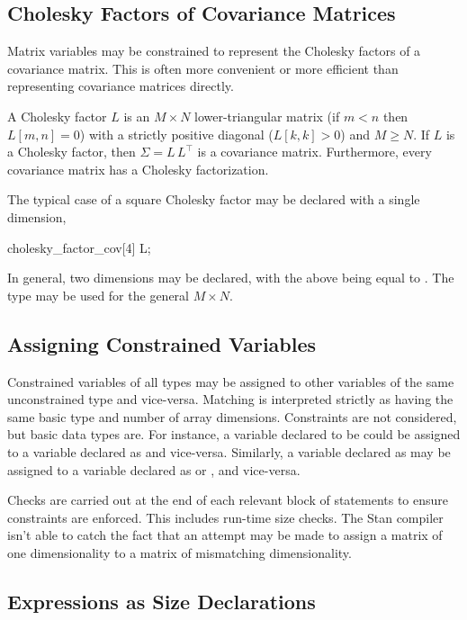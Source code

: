 \subsection{Cholesky Factors of Covariance Matrices}

Matrix variables may be constrained to represent the Cholesky factors
of a covariance matrix.  This is often more convenient or more
efficient than representing covariance matrices directly.

A Cholesky factor $L$ is an $M \times N$ lower-triangular matrix (if
$m < n$ then $L[m, n] =0$) with a strictly positive diagonal ($L[k, k]
> 0$) and $M \geq N$.  If $L$ is a Cholesky factor, then $\Sigma = L
\, L^{\top}$ is a covariance matrix.  Furthermore, every covariance
matrix has a Cholesky factorization.

The typical case of a square Cholesky factor may be declared with a
single dimension,
%
\begin{stancode}
cholesky_factor_cov[4] L;
\end{stancode}
%
In general, two dimensions may be declared, with the above being equal to
.  The
type  may be used for the general
$M \times N$.

\subsection{Assigning Constrained Variables}

Constrained variables of all types may be assigned to other variables
of the same unconstrained type and vice-versa.  Matching is interpreted strictly
as having the same basic type and number of array dimensions.
Constraints are not considered, but basic data types are. For instance, a
variable declared to be  could be assigned
to a variable declared as  and vice-versa.  Similarly, a
variable declared as  may be assigned to a variable
declared as  or
, and vice-versa.

Checks are carried out at the end of each relevant block of statements
to ensure constraints are enforced.  This includes run-time size
checks.  The Stan compiler isn't able to catch the fact that an
attempt may be made to assign a matrix of one dimensionality to a
matrix of mismatching dimensionality.


\subsection{Expressions as Size Declarations}

